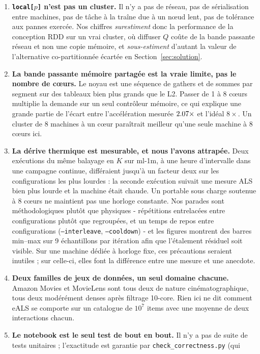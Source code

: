 \begin{enumerate}\itemsep2pt
\item \textbf{\texttt{local[$p$]} n'est pas un cluster.} Il n'y a pas de réseau, pas
de sérialisation entre machines, pas de tâche à la traîne due à un nœud lent, pas de
tolérance aux pannes exercée. Nos chiffres \emph{surestiment} donc la performance de
la conception RDD sur un vrai cluster, où diffuser $Q$ coûte de la bande passante
réseau et non une copie mémoire, et \emph{sous-estiment} d'autant la valeur de
l'alternative co-partitionnée écartée en Section~\ref{sec:solution}.
\item \textbf{La bande passante mémoire partagée est la vraie limite, pas le nombre
de cœurs.} Le noyau est une séquence de gathers et de sommes par segment sur des
tableaux bien plus grands que le L2. Passer de 1 à 8 cœurs multiplie la demande sur un
seul contrôleur mémoire, ce qui explique une grande partie de l'écart entre
l'accélération mesurée $2.07\times$ et l'idéal $8\times$. Un cluster de 8
machines à un cœur paraîtrait meilleur qu'une seule machine à 8 cœurs ici.
\item \textbf{La dérive thermique est mesurable, et nous l'avons attrapée.} Deux
exécutions du même balayage en $K$ sur ml-1m, à une heure d'intervalle dans une
campagne continue, différaient jusqu'à un facteur deux sur les configurations les
plus lourdes : la seconde exécution suivait une mesure ALS bien plus lourde et la
machine était chaude. Un portable sous charge soutenue à 8 cœurs ne maintient pas une
horloge constante. Nos parades sont méthodologiques plutôt que physiques -
répétitions entrelacées entre configurations plutôt que regroupées, et un temps de
repos entre configurations (\texttt{--interleave}, \texttt{--cooldown}) - et les
figures montrent des barres min--max sur 9 échantillons par itération afin que
l'étalement résiduel soit visible. Sur une machine dédiée à horloge fixe, ces
précautions seraient inutiles ; sur celle-ci, elles font la différence entre une
mesure et une anecdote.
\item \textbf{Deux familles de jeux de données, un seul domaine chacune.} Amazon
Movies et MovieLens sont tous deux de nature cinématographique, tous deux
modérément denses après filtrage 10-core. Rien ici ne dit comment eALS se comporte
sur un catalogue de $10^7$ items avec une moyenne de deux interactions chacun.
\item \textbf{Le notebook est le seul test de bout en bout.} Il n'y a pas de suite de
tests unitaires ; l'exactitude est garantie par \texttt{check\_correctness.py} (qui

\end{enumerate}
